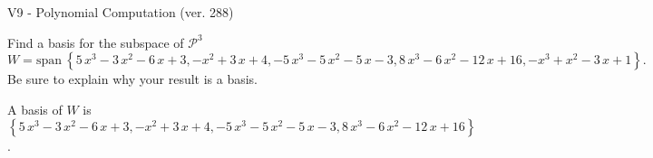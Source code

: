 \begin{exercise}
  \begin{exerciseTitle}V9 - Polynomial Computation (ver. 288)\end{exerciseTitle}
  \begin{exerciseStatement}
    Find a basis for the subspace of \(\mathcal{P}^3\) 
\[W=\mathrm{span}\ \left\{5 \, x^{3} - 3 \, x^{2} - 6 \, x + 3 , -x^{2} + 3 \, x + 4 , -5 \, x^{3} - 5 \, x^{2} - 5 \, x - 3 , 8 \, x^{3} - 6 \, x^{2} - 12 \, x + 16 , -x^{3} + x^{2} - 3 \, x + 1\right\}.\]
 Be sure to explain why your result is a basis.


  \end{exerciseStatement}
  \begin{exerciseAnswer}
   A basis of \(W\) is  \(\left\{5 \, x^{3} - 3 \, x^{2} - 6 \, x + 3 , -x^{2} + 3 \, x + 4 , -5 \, x^{3} - 5 \, x^{2} - 5 \, x - 3 , 8 \, x^{3} - 6 \, x^{2} - 12 \, x + 16\right\}\).
  


  \end{exerciseAnswer}
\end{exercise}